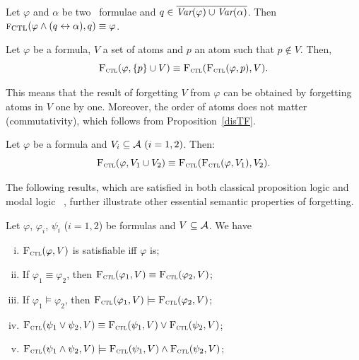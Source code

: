\documentclass{article}
\begin{document}
\begin{lemma}\label{lem:KF:eq}
	Let $\varphi$ and $\alpha$ be two \CTL\ formulae and $q\in
		\overline{\textit{Var}(\varphi) \cup \textit{Var}(\alpha)}$. Then
	${\textsc{f}_{\textrm{CTL}}}(\varphi \wedge (q\leftrightarrow\alpha), q)\equiv \varphi$.
\end{lemma}


\begin{proposition}\label{disTF}
Let $\varphi$ be a formula, $V$ a set of atoms and $p$ an atom such that $p \notin V$. Then,
\[
{\textsc{F}_{\textsc{ctl}}}(\varphi, \{p\} \cup V) \equiv {\textsc{F}_{\textsc{ctl}}}({\textsc{F}_{\textsc{ctl}}}(\varphi, p), V).
\]
\end{proposition}
This means that the result of forgetting $V$ from $\varphi$ can be obtained by forgetting atoms in $V$ one by one.
Moreover, the order of atoms does not matter (commutativity), which follows from  Proposition~\ref{disTF}.

\begin{corollary}[Commutativity]\label{disTFV}
Let $\varphi$ be a formula and $V_i\subseteq{\cal A}~(i=1,2)$. Then:
\[
{\textsc{F}_{\textsc{ctl}}}(\varphi, V_1 \cup V_2) \equiv {\textsc{F}_{\textsc{ctl}}}({\textsc{F}_{\textsc{ctl}}}(\varphi, V_1), V_2).
\]
\end{corollary}


The following results, which are satisfied in both classical proposition logic and modal logic \SFive~\cite{Yan:AIJ:2009}, further illustrate other essential semantic properties of forgetting.
\begin{proposition}\label{pro:ctl:forget:1}
Let $\varphi$, $\varphi_i$, $\psi_i$ ($i=1,2$) be formulas and $V\subseteq {\cal A}$. We have
\begin{enumerate}[(i)]
  \item ${\textsc{F}_{\textsc{ctl}}}(\varphi, V)$ is satisfiable iff $\varphi$ is;
  \item If $\varphi_1 \equiv \varphi_2$, then ${\textsc{F}_{\textsc{ctl}}}(\varphi_1, V) \equiv {\textsc{F}_{\textsc{ctl}}}(\varphi_2, V)$;
  \item If $\varphi_1 \models \varphi_2$, then ${\textsc{F}_{\textsc{ctl}}}(\varphi_1, V) \models {\textsc{F}_{\textsc{ctl}}}(\varphi_2, V)$;
  \item ${\textsc{F}_{\textsc{ctl}}}(\psi_1 \vee \psi_2, V) \equiv {\textsc{F}_{\textsc{ctl}}}(\psi_1, V) \vee {\textsc{F}_{\textsc{ctl}}}(\psi_2, V)$;
  \item ${\textsc{F}_{\textsc{ctl}}}(\psi_1 \wedge \psi_2, V) \models {\textsc{F}_{\textsc{ctl}}}(\psi_1, V) \wedge {\textsc{F}_{\textsc{ctl}}}(\psi_2, V)$;
\end{enumerate}
\end{proposition}
\end{document}
